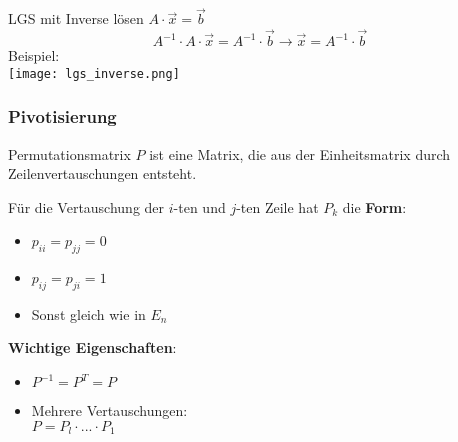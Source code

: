 \begin{concept}{LGS mit Inverse lösen}
    $A \cdot \vec{x} = \vec{b}$
    $$A^{-1} \cdot A \cdot \vec{x} = A^{-1} \cdot \vec{b} \rightarrow \vec{x} = A^{-1} \cdot \vec{b}$$
    Beispiel:\\
    \texttt{[image: lgs\_inverse.png]}
\end{concept}

\subsubsection{Pivotisierung}

\begin{concept}{Permutationsmatrix} $P$ ist eine Matrix, die aus der Einheitsmatrix durch Zeilenvertauschungen entsteht. 
    \vspace{1mm}\\
    \begin{minipage}[t]{0.5\textwidth}
        Für die Vertauschung der $i$-ten und $j$-ten Zeile hat $P_k$ die \textbf{Form}:
        \begin{itemize}
            \item $p_{ii} = p_{jj} = 0$ 
            \item $p_{ij} = p_{ji} = 1$
            \item Sonst gleich wie in $E_n$
        \end{itemize}
    \end{minipage}
    \hspace{3mm}
    \begin{minipage}[t]{0.45\textwidth}
        \vspace{1mm}
        \textbf{Wichtige Eigenschaften}:
        \begin{itemize}
            \item $P^{-1} = P^T = P$
            \item Mehrere Vertauschungen:\\ $P = P_l \cdot ... \cdot P_1$
        \end{itemize}
    \end{minipage}
\end{concept}

